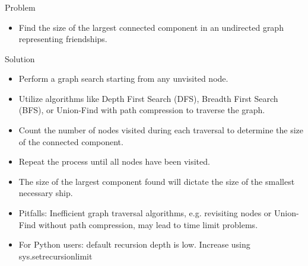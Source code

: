 \begin{frame}
	\frametitle{\problemtitle}
	\begin{block}{Problem}
		\begin{itemize}
			\item Find the size of the largest connected component in an undirected graph representing friendships. \pause{}
		\end{itemize}
	\end{block}
	\begin{block}{Solution}
		\begin{itemize}
			\item Perform a graph search starting from any unvisited node.
			\item Utilize algorithms like Depth First Search (DFS), Breadth First Search (BFS), or Union-Find with path compression to traverse the graph. \pause{}
			\item Count the number of nodes visited during each traversal to determine the size of the connected component.
			\item Repeat the process until all nodes have been visited. \pause{}
			\item The size of the largest component found will dictate the size of the smallest necessary ship. \pause{}

			\item Pitfalls: Inefficient graph traversal algorithms, e.g. revisiting nodes or Union-Find without path compression, may lead to time limit problems.
            \item For Python users: default recursion depth is low. Increase using sys.setrecursionlimit
		\end{itemize}
	\end{block}
\end{frame}
